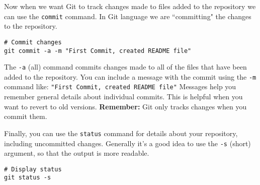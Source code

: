 \noindent Now when we want Git to track changes made to files added to the repository we can use the \texttt{commit} command. In Git language we are ``committing" the changes to the repository.

\begin{knitrout}
\color{fgcolor}\begin{kframe}
\begin{verbatim}
# Commit changes
git commit -a -m "First Commit, created README file"
\end{verbatim}
\end{kframe}
\end{knitrout}


\noindent The \texttt{-a} (all) command commits changes made to all of the files that have been added to the repository. You can include a message with the commit using the \texttt{-m} command like: \texttt{"First Commit, created README file"} Messages help you remember general details about individual commits. This is helpful when you want to revert to old versions. \textbf{Remember:} Git only tracks changes when you commit them. 

Finally, you can use the \texttt{status} command for details about your repository, including uncommitted changes. Generally it's a good idea to use the \texttt{-s} (short) argument, so that the output is more readable.

\begin{knitrout}
\color{fgcolor}\begin{kframe}
\begin{verbatim}
# Display status
git status -s
\end{verbatim}
\end{kframe}
\end{knitrout}


